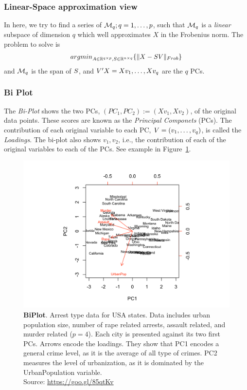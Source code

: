 \documentclass[12pt,a4paper]{article}
\begin{document}
\subsubsection{Linear-Space approximation view}

In here, we try to find a series of $\mathcal{M}_q; q=1,\dots,p$, such that $\mathcal{M}_q$ is a \emph{linear} subspace of dimension $q$ which well approximates $X$ in the Frobenius norm. 
The problem to solve is 
\begin{align}
\label{eq:pca-dim-reduce}
	\textstyle{\mathop{argmin}_{A\in \mathbb{R}^{q \times p}, S\in \mathbb{R}^{n \times q}}}\{ \Vert X- S V \Vert_{Frob} \}
\end{align}
and $\mathcal{M}_q$ is the span of $S$, and $V'X=X v_1,\dots,X v_q$ are the $q$ PCs.



\subsubsection{Bi Plot}
\label{sec:bi_plot}
The \emph{Bi-Plot} shows the two PCs, $(PC_1,PC_2):=(Xv_1,Xv_2)$, of the original data points.
These scores are known as the \emph{Principal Componets} (PCs). 
The contribution of each original variable to each PC, $V=(v_1,\dots,v_q)$, is called the \emph{Loadings}.
The bi-plot also shows $v_1,v_2$, i.e., the contribution of each of the original variables to each of the PCs. 
See example in Figure~\ref{fig:usaarrests}.


\begin{figure}[ht]
	\centering
	\includegraphics[width=0.7\linewidth]{USAarrests}
	\caption{\textbf{BiPlot}.
		Arrest type data for USA states. 
		Data includes urban population size, number of rape related arrests, assault related, and murder related ($p=4$). 
		Each city is presented against its two first PCs. 
		Arrows encode the loadings. 
		They show that PC1 encodes a general crime level, as it is the average of all type of crimes. 
		PC2 measures the level of urbanization, as it is dominated by the UrbanPopulation variable. 		
		\\ Source: \url{https://goo.gl/85qtKv}}
	\label{fig:usaarrests}
\end{figure}
\end{document}

